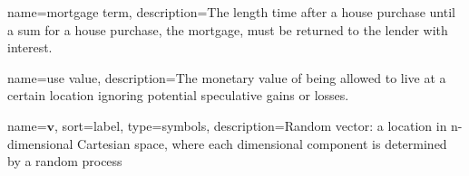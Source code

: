 {
name=mortgage term,
description={The length time after a house purchase until a sum for a house purchase, the mortgage, must be returned to the lender with interest.}
}

{
name=use value,
description={The monetary value of being allowed to live at a certain location ignoring potential speculative gains or losses. }
}



{
name={$\mathbf{v}$},
sort={label},
type=symbols,
description={Random vector: a location in n-dimensional Cartesian space, where each dimensional component is determined by a random process}
}